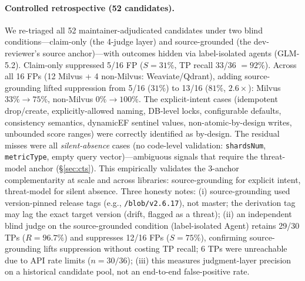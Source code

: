 \documentclass[sigconf, anonymous, review]{acmart}
\begin{document}
\paragraph{Controlled retrospective (52 candidates).} We re-triaged all 52 maintainer-adjudicated candidates under two blind conditions---claim-only (the 4-judge layer) and source-grounded (the dev-reviewer's source anchor)---with outcomes hidden via label-isolated agents (GLM-5.2). Claim-only suppressed 5/16 FP ($S{=}31\%$, TP recall 33/36 $= 92\%$). Across all 16 FPs (12 Milvus + 4 non-Milvus: Weaviate/Qdrant), adding source-grounding lifted suppression from 5/16 ($31\%$) to 13/16 ($81\%$, $2.6\times$): Milvus $33\%{\to}75\%$, non-Milvus $0\%{\to}100\%$. The explicit-intent cases (idempotent drop/create, explicitly-allowed naming, DB-level locks, configurable defaults, consistency semantics, dynamicEF sentinel values, non-atomic-by-design writes, unbounded score ranges) were correctly identified as by-design. The residual misses were all \emph{silent-absence} cases (no code-level validation: \texttt{shardsNum}, \texttt{metricType}, empty query vector)---ambiguous signals that require the threat-model anchor (\S\ref{sec:cts}). This empirically validates the 3-anchor complementarity at scale and across libraries: source-grounding for explicit intent, threat-model for silent absence. Three honesty notes: (i) source-grounding used version-pinned release tags (e.g., \texttt{/blob/v2.6.17}), not master; the derivation tag may lag the exact target version (drift, flagged as a threat); (ii) an independent blind judge on the source-grounded condition (label-isolated Agent) retains 29/30 TPs ($R{=}96.7\%$) and suppresses 12/16 FPs ($S{=}75\%$), confirming source-grounding lifts suppression without costing TP recall; 6 TPs were unreachable due to API rate limits ($n{=}30/36$); (iii) this measures judgment-layer precision on a historical candidate pool, not an end-to-end false-positive rate.
\end{document}
